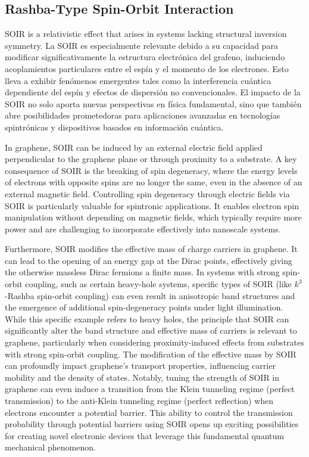 \subsection{Rashba-Type Spin-Orbit Interaction}\label{subsec:rashba-type-spin-orbit-interaction}

SOIR is a relativistic effect that arises in systems lacking structural inversion symmetry\cite{AvishaiPhysRevB2021}.
La SOIR es especialmente relevante debido a su capacidad para modificar significativamente la estructura electrónica del grafeno, induciendo acoplamientos particulares entre el espín y el momento de los electrones.
Esto lleva a exhibir fenómenos emergentes tales como la interferencia cuántica dependiente del espín y efectos de dispersión no convencionales.
El impacto de la SOIR no solo aporta nuevas perspectivas en física fundamental, sino que también abre posibilidades prometedoras para aplicaciones avanzadas en tecnologías spintrónicas y dispositivos basados en información cuántica.

In graphene, SOIR can be induced by an external electric field applied perpendicular to the graphene plane or through proximity to a substrate\cite{ShcherbakovSciAdv2021}.
A key consequence of SOIR is the breaking of spin degeneracy, where the energy levels of electrons with opposite spins are no longer the same, even in the absence of an external magnetic field\cite{DelkhoshPhysE2015}.
Controlling spin degeneracy through electric fields via SOIR is particularly valuable for spintronic applications.
It enables electron spin manipulation without depending on magnetic fields, which typically require more power and are challenging to incorporate effectively into nanoscale systems.


Furthermore, SOIR modifies the effective mass of charge carriers in graphene.
It can lead to the opening of an energy gap at the Dirac points, effectively giving the otherwise massless Dirac fermions a finite mass.
In systems with strong spin-orbit coupling, such as certain heavy-hole systems, specific types of SOIR (like $k^3$-Rashba spin-orbit coupling) can even result in anisotropic band structures and the emergence of additional spin-degeneracy points under light illumination.
While this specific example refers to heavy holes, the principle that SOIR can significantly alter the band structure and effective mass of carriers is relevant to graphene, particularly when considering proximity-induced effects from substrates with strong spin-orbit coupling\cite{GindikinPhysRevB2025}.
The modification of the effective mass by SOIR can profoundly impact graphene's transport properties, influencing carrier mobility and the density of states.
Notably, tuning the strength of SOIR in graphene can even induce a transition from the Klein tunneling regime (perfect transmission) to the anti-Klein tunneling regime (perfect reflection) when electrons encounter a potential barrier.
This ability to control the transmission probability through potential barriers using SOIR opens up exciting possibilities for creating novel electronic devices that leverage this fundamental quantum mechanical phenomenon\cite{YaoMater2024}.

